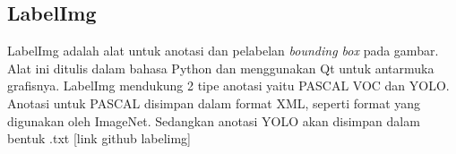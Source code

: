 \documentclass[../thesis.tex]{subfiles}
\begin{document}
\subsection{LabelImg}
LabelImg adalah alat untuk anotasi dan pelabelan \textit{bounding box} pada gambar. Alat ini ditulis dalam bahasa Python dan menggunakan Qt untuk antarmuka grafisnya. LabelImg mendukung 2 tipe anotasi yaitu PASCAL VOC dan YOLO. 
Anotasi untuk PASCAL disimpan dalam format XML, seperti format yang digunakan oleh ImageNet. Sedangkan anotasi YOLO akan disimpan dalam bentuk .txt [link github labelimg]
\end{document}

